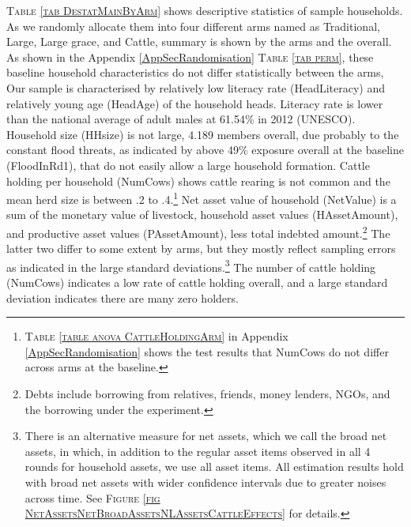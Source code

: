 	\textsc{\small Table \ref{tab DestatMainByArm}} shows descriptive statistics of sample households. As we randomly allocate them into four different arms named as \textsf{Traditional}, \textsf{Large}, \textsf{Large grace}, and \textsf{Cattle}, summary is shown by the arms and the overall. As shown in the Appendix \ref{AppSecRandomisation} \textsc{\normalsize Table \ref{tab perm}}, these baseline household characteristics do not differ statistically between the arms,  Our sample is characterised by relatively low literacy rate (\textsf{HeadLiteracy}) and relatively young age (\textsf{HeadAge}) of the household heads. Literacy rate is lower than the national average of adult males at 61.54\% in 2012 (UNESCO). Household size (\textsf{HHsize}) is not large, 4.189 members overall, due probably to the constant flood threats, as indicated by above 49\% exposure overall at the baseline (\textsf{FloodInRd1}), that do not easily allow a large household formation. Cattle holding per household (\textsf{NumCows}) shows cattle rearing is not common and the mean herd size is between .2 to .4.\footnote{ \textsc{Table \ref{table anova CattleHoldingArm}} in Appendix \ref{AppSecRandomisation} shows the test results that \textsf{NumCows} do not differ across arms at the baseline. } Net asset value of household (\textsf{NetValue}) is a sum of the monetary value of livestock, household asset values (\textsf{HAssetAmount}), and productive asset values (\textsf{PAssetAmount}), less total indebted amount.\footnote{Debts include borrowing from relatives, friends, money lenders, NGOs, and the borrowing under the experiment. } The latter two differ to some extent by arms, but they mostly reflect sampling errors as indicated in the large standard deviations.\footnote{There is an alternative measure for net assets, which we call the broad net assets, in which, in addition to the regular asset items observed in all 4 rounds for household assets, we use all asset items. All estimation results hold with broad net assets with wider confidence intervals due to greater noises across time. See \textsc{Figure \ref{fig NetAssetsNetBroadAssetsNLAssetsCattleEffects}} for details. } The number of cattle holding (\textsf{NumCows}) indicates a low rate of cattle holding overall, and a large standard deviation indicates there are many zero holders. 

